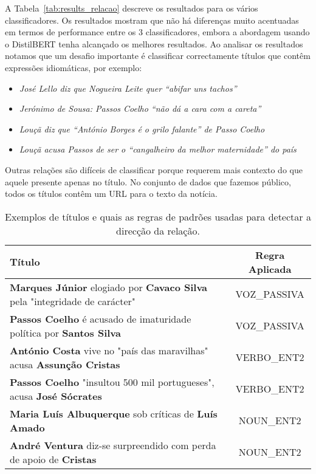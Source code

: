 \documentclass[a4paper, twocolumn, 11pt, twoside]{article}
\begin{document}
A Tabela~\ref{tab:results_relacao} descreve os resultados para os vários classificadores. Os resultados mostram que não há diferenças muito acentuadas em termos de performance entre os 3 classificadores, embora a abordagem usando o DistilBERT tenha alcançado os melhores resultados. Ao analisar os resultados notamos que um desafio importante é classificar correctamente títulos que contêm expressões idiomáticas, por exemplo:

\begin{itemize}
\item{\textit{José Lello diz que Nogueira Leite quer “abifar uns tachos”}}
\item{\textit{Jerónimo de Sousa: Passos Coelho “não dá a cara com a careta”}}
\item{\textit{Louçã diz que “António Borges é o grilo falante” de Passo Coelho}}
\item{\textit{Louçã acusa Passos de ser o “cangalheiro da melhor maternidade” do país}}
\end{itemize}

Outras relações são difíceis de classificar porque requerem mais contexto do que aquele presente apenas no título. No conjunto de dados que fazemos público, todos os títulos contêm um URL para o texto da notícia.

\begin{table*}
  \centering
  \begin{tabular}{lc}
      {\bf Título} & {\bf Regra Aplicada} \\
      \hline
	  \textbf{Marques Júnior} elogiado por \textbf{Cavaco Silva} pela "integridade de carácter" & VOZ\_PASSIVA \\
	  \textbf{Passos Coelho} é acusado de imaturidade política por \textbf{Santos Silva}  		& VOZ\_PASSIVA \\
	  \textbf{António Costa} vive no "país das maravilhas" acusa \textbf{Assunção Cristas}      & VERBO\_ENT2 \\
	  \textbf{Passos Coelho} "insultou 500 mil portugueses", acusa \textbf{José Sócrates}		& VERBO\_ENT2 \\ 
	  \textbf{Maria Luís Albuquerque} sob críticas de \textbf{Luís Amado}						& NOUN\_ENT2 \\
	  \textbf{André Ventura} diz-se surpreendido com perda de apoio de \textbf{Cristas}			& NOUN\_ENT2 \\

	  \hline
  \end{tabular}
  \caption{Exemplos de títulos e quais as regras de padrões usadas para detectar a direcção da relação.}
  \label{tab:examples_patterns_direction}
\end{table*}
\end{document}
